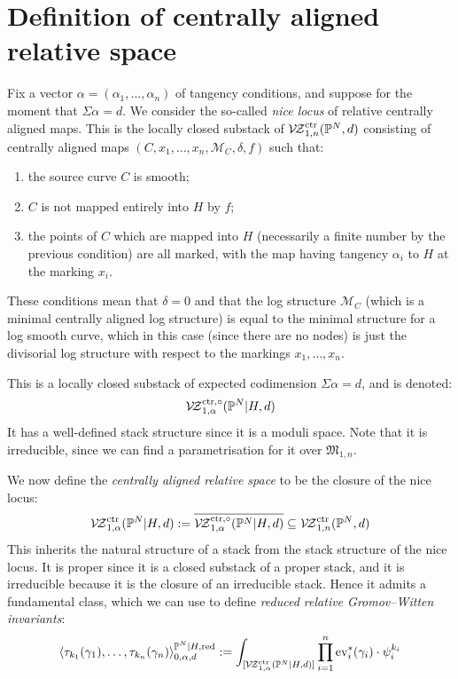 \documentclass[11pt]{amsart}
\newcommand{\PP}{\mathbb P}
\newcommand{\VZc}[4]{\mathcal{V\!Z}^{\rm{ctr}}_{#1,#2}(#3,#4)}
\newcommand{\VZco}[4]{\mathcal{V\!Z}^{\rm{ctr},\circ}_{#1,#2}(#3,#4)}
\newcommand{\ev}{\operatorname{ev}}
\newcommand{\Mcal}{\mathcal{M}}
\newcommand{\Mfrak}{\mathfrak{M}}
\theoremstyle{definition}
\theoremstyle{definition}
\begin{document}
\section{Definition of centrally aligned relative space}
Fix a vector $\alpha=(\alpha_1,\ldots,\alpha_n)$ of tangency conditions, and suppose for the moment that $\Sigma \alpha = d$. We consider the so-called \emph{nice locus} of relative centrally aligned maps. This is the locally closed substack of $\VZc{1}{n}{\PP^N}{d}$ consisting of centrally aligned maps $(C,x_1,\ldots,x_n,\Mcal_C,\delta,f)$ such that:
\begin{enumerate}
\item the source curve $C$ is smooth;
\item $C$ is not mapped entirely into $H$ by $f$;
\item the points of $C$ which are mapped into $H$ (necessarily a finite number by the previous condition) are all marked, with the map having tangency $\alpha_i$ to $H$ at the marking $x_i$.
\end{enumerate}
These conditions mean that $\delta=0$ and that the log structure $\Mcal_C$ (which is a minimal centrally aligned log structure) is equal to the minimal structure for a log smooth curve, which in this case (since there are no nodes) is just the divisorial log structure with respect to the markings $x_1,\ldots,x_n$.

This is a locally closed substack of expected codimension $\Sigma \alpha=d$, and is denoted:
\begin{equation*} \VZco{1}{\alpha}{\PP^N|H}{d} \end{equation*}
It has a well-defined stack structure since it is a moduli space. Note that it is irreducible, since we can find a parametrisation for it over $\Mfrak_{1,n}$.

We now define the \emph{centrally aligned relative space} to be the closure of the nice locus:
\begin{equation*} \VZc{1}{\alpha}{\PP^N|H}{d} := \overline{\VZco{1}{\alpha}{\PP^N|H}{d}} \subseteq \VZc{1}{n}{\PP^N}{d} \end{equation*}
This inherits the natural structure of a stack from the stack structure of the nice locus. It is proper since it is a closed substack of a proper stack, and it is irreducible because it is the closure of an irreducible stack. Hence it admits a fundamental class, which we can use to define \emph{reduced relative Gromov--Witten invariants}:
\begin{equation*} \langle \tau_{k_1}(\gamma_1), \ldots, \tau_{k_n}(\gamma_n) \rangle^{\PP^N|H, \operatorname{red}}_{0,\alpha,d} := \int_{[\VZc{1}{\alpha}{\PP^N|H}{d}]} \prod_{i=1}^n \ev_i^*(\gamma_i) \cdot \psi_i^{k_i} \end{equation*}
\end{document}
